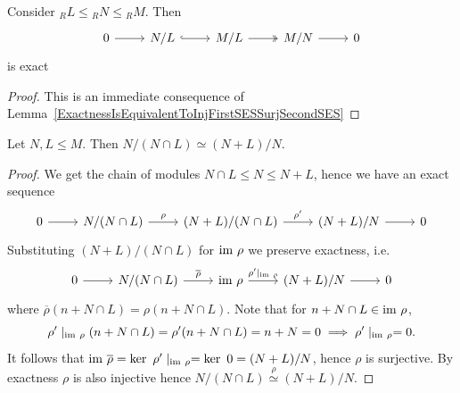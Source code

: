 \begin{lemma}\label{NoetherSecondIsoForModules}
    Consider $_RL\leq {_RN} \leq {_RM}$. Then 
        $$  
            \begin{tikzcd}
                0 \arrow[r] & N/L \arrow[r,hookrightarrow] & M/L \arrow[r, twoheadrightarrow] &M/N \arrow[r] &0
            \end{tikzcd}
        $$
    is exact
\end{lemma}
\begin{proof}
    This is an immediate consequence of Lemma~\ref{ExactnessIsEquivalentToInjFirstSESSurjSecondSES}
\end{proof}
\begin{theorem}\label{FirstNoetherIsoTheorem}
    Let $N,L\leq M$. Then $N/(N\cap L)\simeq (N+L)/N$.
\end{theorem}
\begin{proof}
    We get the chain of modules $N\cap L \leq N \leq N+L$, hence we have an exact sequence 
    $$\begin{tikzcd}
        0\arrow[r] & N/(N\cap L) \arrow[r,"\rho"] & (N+L)/(N\cap L) \arrow{r}{\rho'} & (N+L)/N \arrow[r] & 0
    \end{tikzcd}$$
    Substituting $(N+L)/(N\cap L)$ for $\mathrm{im} \ \rho$ we preserve exactness, i.e.
    $$\begin{tikzcd}
        0\arrow[r] & N/(N\cap L) \arrow[r,"\overline{\rho}"] & \im\ \rho \arrow{r}{\rho'\mid_{\im\ \rho}} & (N+L)/N \arrow[r] & 0
    \end{tikzcd}$$
    where $\overline{\rho}(n+N\cap L)= \rho(n+N\cap L).$ Note that for $n+ N\cap L \in \im\ \rho$, 
    $$\rho'\mid_{\mathrm{im}\ \rho}(n+N\cap L) = \rho' (n+N\cap L)= n +N=0 \implies \rho'\mid_{\mathrm{im}\ \rho} = 0.$$
    It follows that $\im \ \overline{\rho} = \ker\ \rho'\mid_{\im\ \rho} = \ker \ 0 = (N+L)/N$, hence $\rho$ is surjective. By exactness $\rho$ is also injective hence $N/(N\cap L) \overset{\rho}{\simeq} (N+L)/N$.
\end{proof}
